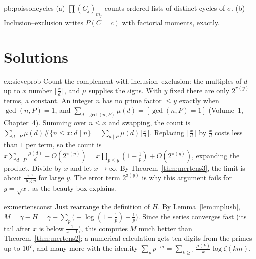 \begin{hint}{pb:poissoncycles}
(a) $\prod(C_j)_{m_j}$ counts ordered lists of distinct cycles of $\sigma$. (b) Inclusion--exclusion writes $P(C=c)$ with
factorial moments, exactly.
\end{hint}

\section{Solutions}

\begin{solution}{ex:sieveprob}
\idea Count the complement with inclusion--exclusion: the multiples of $d$ up to $x$ number $\lfloor\frac xd\rfloor$, and $\mu$ supplies the signs. With $y$ fixed there are
only $2^{\pi(y)}$ terms, a constant.
\writeup An integer $n$ has no prime factor $\le y$ exactly when $\gcd(n,P)=1$, and $\sum_{d\mid\gcd(n,P)}\mu(d)=[\gcd(n,P)=1]$ (Volume~1, Chapter~4). Summing over $n\le x$ and
swapping, the count is $\sum_{d\mid P}\mu(d)\#\{n\le x:d\mid n\}=\sum_{d\mid P}\mu(d)\lfloor\frac xd\rfloor$. Replacing $\lfloor\frac xd\rfloor$ by $\frac xd$ costs less than $1$ per term, so the count is
$x\sum_{d\mid P}\frac{\mu(d)}d+O(2^{\pi(y)})=x\prod_{p\le y}(1-\frac1p)+O(2^{\pi(y)})$, expanding the product. Divide by $x$ and let $x\to\infty$. By Theorem~\ref{thm:mertens3},
the limit is about $\frac{e^{-\gamma}}{\log y}$ for large $y$. The error term $2^{\pi(y)}$ is why this argument fails for $y=\sqrt x$, as the beauty box explains.
\end{solution}

\begin{solution}{ex:mertensconst}
\idea Just rearrange the definition of $H$.
\writeup By Lemma~\ref{lem:mplush}, $M=\gamma-H=\gamma-\sum_p\bigl(-\log(1-\frac1p)-\frac1p\bigr)$. Since the series converges fast (its tail after $x$ is below $\frac1{x-1}$),
this computes $M$ much better than Theorem~\ref{thm:mertens2}; a numerical calculation gets ten digits from the primes up to $10^7$, and many more with the identity
$\sum_pp^{-m}=\sum_{k\ge1}\frac{\mu(k)}k\log\zeta(km)$.
\end{solution}

